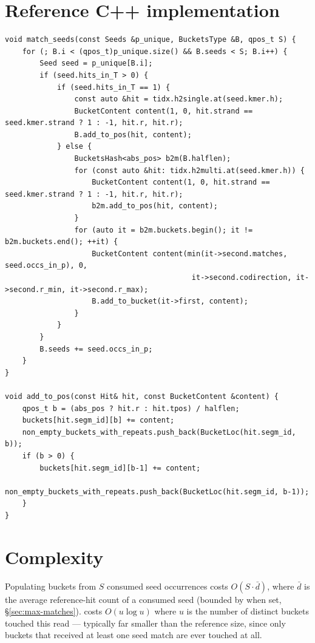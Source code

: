 \section{Reference C++ implementation}

\begin{lstlisting}[style=cppstyle,caption={\code{match\_seeds} and \code{Buckets::add\_to\_pos}, \texttt{src/shmap.h} \& \texttt{src/buckets.h}}]
void match_seeds(const Seeds &p_unique, BucketsType &B, qpos_t S) {
    for (; B.i < (qpos_t)p_unique.size() && B.seeds < S; B.i++) {
        Seed seed = p_unique[B.i];
        if (seed.hits_in_T > 0) {
            if (seed.hits_in_T == 1) {
                const auto &hit = tidx.h2single.at(seed.kmer.h);
                BucketContent content(1, 0, hit.strand == seed.kmer.strand ? 1 : -1, hit.r, hit.r);
                B.add_to_pos(hit, content);
            } else {
                BucketsHash<abs_pos> b2m(B.halflen);
                for (const auto &hit: tidx.h2multi.at(seed.kmer.h)) {
                    BucketContent content(1, 0, hit.strand == seed.kmer.strand ? 1 : -1, hit.r, hit.r);
                    b2m.add_to_pos(hit, content);
                }
                for (auto it = b2m.buckets.begin(); it != b2m.buckets.end(); ++it) {
                    BucketContent content(min(it->second.matches, seed.occs_in_p), 0,
                                           it->second.codirection, it->second.r_min, it->second.r_max);
                    B.add_to_bucket(it->first, content);
                }
            }
        }
        B.seeds += seed.occs_in_p;
    }
}

void add_to_pos(const Hit& hit, const BucketContent &content) {
    qpos_t b = (abs_pos ? hit.r : hit.tpos) / halflen;
    buckets[hit.segm_id][b] += content;
    non_empty_buckets_with_repeats.push_back(BucketLoc(hit.segm_id, b));
    if (b > 0) {
        buckets[hit.segm_id][b-1] += content;
        non_empty_buckets_with_repeats.push_back(BucketLoc(hit.segm_id, b-1));
    }
}
\end{lstlisting}

\section{Complexity}

Populating buckets from $S$ consumed seed occurrences costs $O(S \cdot \bar d)$, where $\bar d$ is
the average reference-hit count of a consumed seed (bounded by  when set,
\S\ref{sec:max-matches}).  costs $O(u \log u)$ where $u$ is the number
of distinct buckets touched this read --- typically far smaller than the reference size, since
only buckets that received at least one seed match are ever touched at all.
